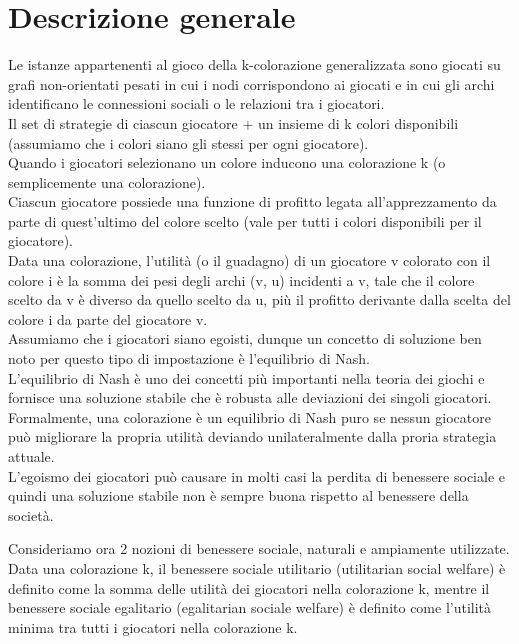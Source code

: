 \section{Descrizione generale}
\justify
Le istanze appartenenti al gioco della k-colorazione generalizzata sono giocati su grafi non-orientati pesati in cui i nodi corrispondono ai giocati e in cui gli archi identificano le connessioni sociali o le relazioni tra i giocatori.\\
Il set di strategie di ciascun giocatore + un insieme di k colori disponibili (assumiamo che i colori siano gli stessi per ogni giocatore).\\
Quando i giocatori selezionano un colore inducono una colorazione k (o semplicemente una colorazione).\\
Ciascun giocatore possiede una funzione di profitto legata all'apprezzamento da parte di quest'ultimo del colore scelto (vale per tutti i colori disponibili per il giocatore).\\
Data una colorazione, l'utilità (o il guadagno) di un giocatore v colorato con il colore i è la somma dei pesi degli archi (v, u) incidenti a v, tale che il colore scelto da v è diverso da quello scelto da u, più il profitto derivante dalla scelta del colore i da parte del giocatore v.\\
Assumiamo che i giocatori siano egoisti, dunque un concetto di soluzione ben noto per questo tipo di impostazione è l'equilibrio di Nash.\\
L'equilibrio di Nash è uno dei concetti più importanti nella teoria dei giochi e fornisce una soluzione stabile che è robusta alle deviazioni dei singoli giocatori.\\
Formalmente, una colorazione è un equilibrio di Nash puro se nessun giocatore può migliorare la propria utilità deviando unilateralmente dalla proria strategia attuale.\\
L'egoismo dei giocatori può causare in molti casi la perdita di benessere sociale e quindi una soluzione stabile non è sempre buona rispetto al benessere della società.\newline

Consideriamo ora 2 nozioni di benessere sociale, naturali e ampiamente utilizzate.\\
Data una colorazione k, il benessere sociale utilitario (utilitarian social welfare) è definito come la somma delle utilità dei giocatori nella colorazione k, mentre il benessere sociale egalitario (egalitarian sociale welfare) è definito come l'utilità minima tra tutti i giocatori nella colorazione k.\newline


